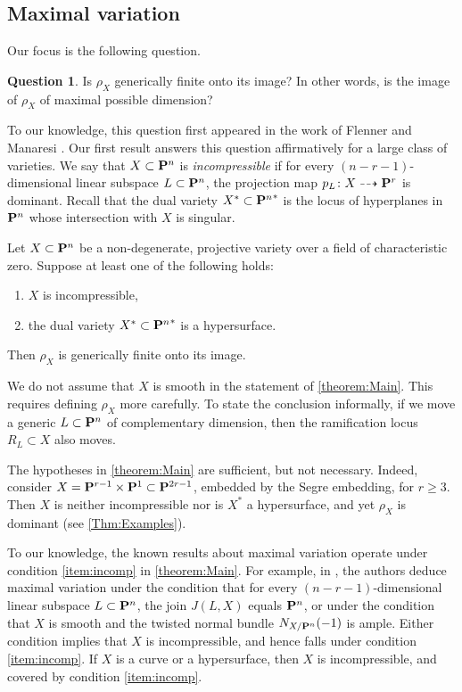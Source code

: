 \documentclass[11pt,reqno]{amsart}
\theoremstyle{plain}
\theoremstyle{definition}
\newtheorem{question}[theorem]{Question}
\theoremstyle{remark}
\numberwithin{equation}{section}
\numberwithin{equation}{section}
\begin{document}
\subsection{Maximal variation}
Our focus is the following question.
\begin{question}\label{q:maxvar}
  Is $\rho_{X}$ generically finite onto its image? In other words, is the image of $\rho_X$ of maximal possible dimension?
\end{question}

To our knowledge, this question first appeared in the work of Flenner and Manaresi \cite{MANAFlenn:}.
Our first result answers this question affirmatively for a large class of varieties.
We say that $X \subset \P^n$ is \emph{incompressible} if for every $(n-r-1)$-dimensional linear subspace $L \subset \P^n$, the projection map $p_L \from X \dashrightarrow \P^r$ is dominant.
Recall that the dual variety $X^* \subset {\P^n}^*$ is the locus of hyperplanes in $\P^n$ whose intersection with $X$ is singular.
\begin{maintheorem}\label{theorem:Main}
  Let $X \subset \P^n$ be a non-degenerate, projective variety over a field of characteristic zero.
  Suppose at least one of the following holds:
  \begin{enumerate}
  \item\label{item:incomp} $X$ is incompressible, 
  \item\label{item:dual} the dual variety $X^* \subset {\P^n}^*$ is a hypersurface.
  \end{enumerate}
  Then $\rho_{X}$ is generically finite onto its image.
\end{maintheorem} 
We do not assume that $X$ is smooth in the statement of \autoref{theorem:Main}.
This requires defining $\rho_X$ more carefully.
To state the conclusion informally, if we move a generic $L \subset \P^n$ of complementary dimension, then the ramification locus $R_L \subset X$ also moves.

The hypotheses in \autoref{theorem:Main} are sufficient, but not necessary.
Indeed, consider $X = \P^{r-1} \times \P^1 \subset \P^{2r-1}$, embedded by the Segre embedding, for $r \geq 3$.
Then $X$ is neither incompressible nor is $X^*$ a hypersurface, and yet $\rho_X$ is dominant (see \autoref{Thm:Examples}).

To our knowledge, the known results about maximal variation operate under condition \eqref{item:incomp} in \autoref{theorem:Main}.
For example, in \cite{MANAFlenn:}, the authors deduce maximal variation under the condition that for every $(n-r-1)$-dimensional linear subspace $L \subset \P^n$, the join $J(L, X)$ equals $\P^n$, or under the condition that $X$ is smooth and the twisted normal bundle $N_{X/\P^n}(-1)$ is ample.
Either condition implies that $X$ is incompressible, and hence falls under condition \eqref{item:incomp}.
If $X$ is a curve or a hypersurface, then $X$ is incompressible, and covered by condition \eqref{item:incomp}.
\end{document}

